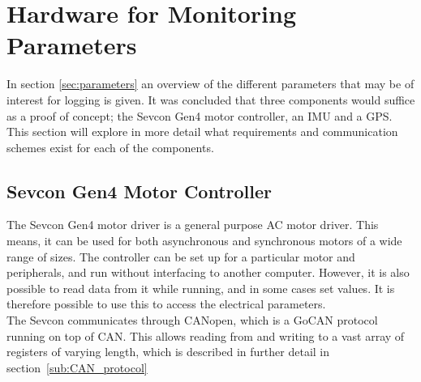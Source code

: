 \section{Hardware for Monitoring Parameters}

\label{sec:hardware_for_par}
In section \ref{sec:parameters} an overview of the different parameters that may be of interest for logging is given.
It was concluded that three components would suffice as a proof of concept; the Sevcon Gen4 motor controller, an IMU and a GPS.
This section will explore in more detail what requirements and communication schemes exist for each of the components.

\subsection{Sevcon Gen4 Motor Controller}
\label{sec:interfacin_with_sevcon}

The Sevcon Gen4 motor driver is a general purpose AC motor driver. 
This means, it can be used for both asynchronous and synchronous motors of a wide range of sizes.
The controller can be set up for a particular motor and peripherals, and run without interfacing to another computer.
However, it is also possible to read data from it while running, and in some cases set values.
It is therefore possible to use this to access the electrical parameters. \\

The Sevcon communicates through CANopen, which is a GoCAN protocol running on top of CAN.
This allows reading from and writing to a vast array of registers of varying length, which is described in further detail in section~\ref{sub:CAN_protocol}\\

